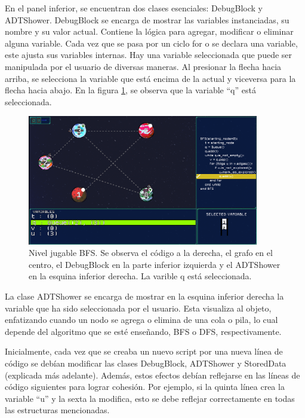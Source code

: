 En el panel inferior, se encuentran dos clases esenciales: DebugBlock y ADTShower. DebugBlock se encarga de mostrar las variables instanciadas, su nombre y su valor actual. Contiene la lógica para agregar, modificar o eliminar alguna variable. Cada vez que se pasa por un ciclo for o se declara una variable, este ajusta sus variables internas. Hay una variable seleccionada que puede ser manipulada por el usuario de diversas maneras. Al presionar la flecha hacia arriba, se selecciona la variable que está encima de la actual y viceversa para la flecha hacia abajo. En la figura \ref{BFSFullGame}, se observa que la variable ``q'' está seleccionada.

\begin{figure}[h]
	\centering
	\includegraphics[width=0.9\textwidth]{imagenes/BFSFullGame.png}
	\caption{Nivel jugable BFS. Se observa el código a la derecha, el grafo en el centro, el DebugBlock en la parte inferior izquierda y el ADTShower en la esquina inferior derecha. La varible q está seleccionada.}
	\label{BFSFullGame}
\end{figure}

La clase ADTShower se encarga de mostrar en la esquina inferior derecha la variable que ha sido seleccionada por el usuario. Esta visualiza al objeto, enfatizando cuando un nodo se agrega o elimina de una cola o pila, lo cual depende del algoritmo que se esté enseñando, BFS o DFS, respectivamente.

Inicialmente, cada vez que se creaba un nuevo script por una nueva línea de código se debían modificar las clases DebugBlock, ADTShower y StoredData (explicada más adelante). Además, estos efectos debían reflejarse en las líneas de código siguientes para lograr cohesión. Por ejemplo, si la quinta línea crea la variable ``u'' y la sexta la modifica, esto se debe reflejar correctamente en todas las estructuras mencionadas.

